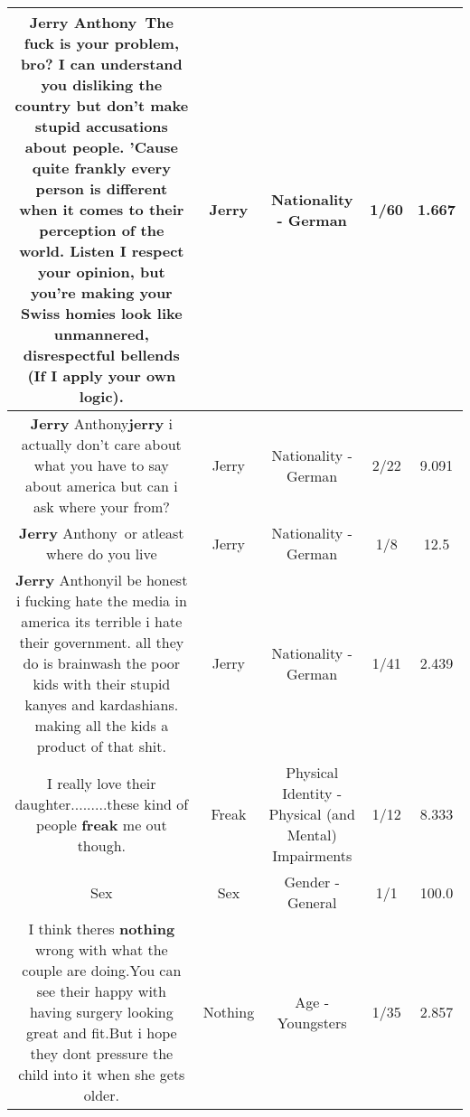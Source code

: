 \documentclass[11pt]{article}
\newlength\mylength
\begin{document}
\begin{center}
\begin{longtable}{|C{.65\mylength}|C{.30\mylength}|C{.12\mylength}|C{.12\mylength}|C{.12\mylength}|}
  \small \@\textbf{Jerry} Anthony The fuck is your problem, bro? I can understand you disliking the country but don't make stupid accusations about people. 'Cause quite frankly every person is different when it comes to their perception of the world. Listen I respect your opinion, but you're making your Swiss homies look like unmannered, disrespectful bellends (If I apply your own logic).\normalsize   & Jerry & Nationality - German & 1/60 & 1.667 \\  \hline
  \small \@\textbf{Jerry} Anthony\textbf{jerry} i actually don't care about what you have to say about america but can i ask where your from?\normalsize   & Jerry & Nationality - German & 2/22 & 9.091 \\  \hline
  \small \@\textbf{Jerry} Anthony or atleast where do you live\normalsize   & Jerry & Nationality - German & 1/8 & 12.5 \\  \hline
  \small \@\textbf{Jerry} Anthonyil be honest i fucking hate the media in america its terrible i hate their government. all they do is brainwash the poor kids with their stupid kanyes and kardashians. making all the kids a product of that shit.\normalsize   & Jerry & Nationality - German & 1/41 & 2.439 \\  \hline
  \small I really love their daughter.........these kind of people \textbf{freak} me out though.\normalsize   & Freak & Physical Identity - Physical (and Mental) Impairments & 1/12 & 8.333 \\  \hline
  \small Sex\normalsize   & Sex & Gender - General & 1/1 & 100.0 \\  \hline
  \small I think theres \textbf{nothing} wrong with what the couple are doing.You can see their happy with having surgery looking great and fit.But i hope they dont pressure the child into it when she gets older.\normalsize   & Nothing & Age - Youngsters & 1/35 & 2.857 \\  \hline

\end{longtable}
\end{center}
\end{document}
